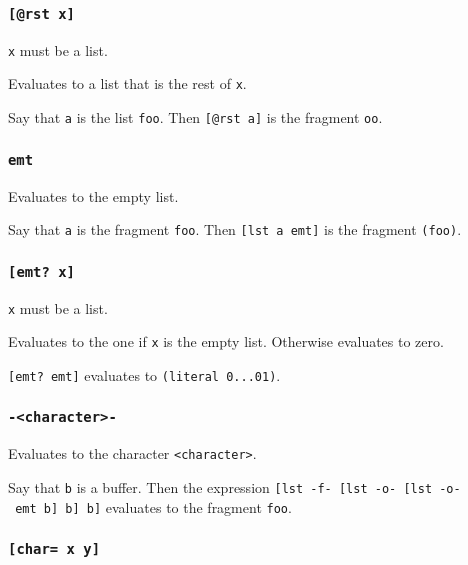 \documentclass[]{article}
\begin{document}
\subsubsection{\texorpdfstring{\texttt{{[}@rst\ x{]}}}{{[}@rst x{]}}}\label{rst-x}

\texttt{x} must be a list.

Evaluates to a list that is the rest of \texttt{x}.

Say that \texttt{a} is the list \texttt{foo}. Then
\texttt{{[}@rst\ a{]}} is the fragment \texttt{oo}.

\subsubsection{\texorpdfstring{\texttt{emt}}{emt}}\label{emt}

Evaluates to the empty list.

Say that \texttt{a} is the fragment \texttt{foo}. Then
\texttt{{[}lst\ a\ emt{]}} is the fragment \texttt{(foo)}.

\subsubsection{\texorpdfstring{\texttt{{[}emt?\ x{]}}}{{[}emt? x{]}}}\label{emt-x}

\texttt{x} must be a list.

Evaluates to the one if \texttt{x} is the empty list. Otherwise
evaluates to zero.

\texttt{{[}emt?\ emt{]}} evaluates to \texttt{(literal\ 0...01)}.

\subsubsection{\texorpdfstring{\texttt{-\textless{}character\textgreater{}-}}{-\textless{}character\textgreater{}-}}\label{character-}

Evaluates to the character \texttt{\textless{}character\textgreater{}}.

Say that \texttt{b} is a buffer. Then the expression
\texttt{{[}lst\ -f-\ {[}lst\ -o-\ {[}lst\ -o-\ emt\ b{]}\ b{]}\ b{]}}
evaluates to the fragment \texttt{foo}.

\subsubsection{\texorpdfstring{\texttt{{[}char=\ x\ y{]}}}{{[}char= x y{]}}}\label{char-x-y}
\end{document}

